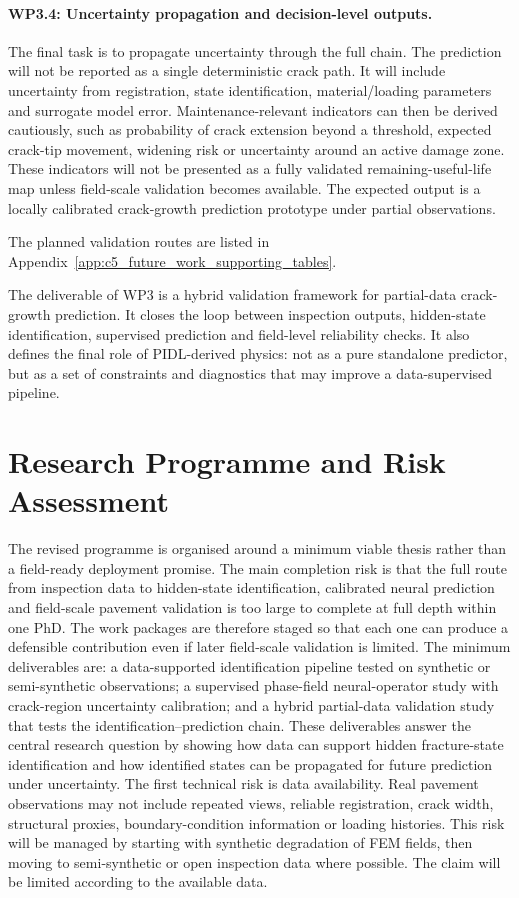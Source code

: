 \paragraph{WP3.4: Uncertainty propagation and decision-level outputs.}
The final task is to propagate uncertainty through the full chain.
The prediction will not be reported as a single deterministic crack path.
It will include uncertainty from registration, state identification, material/loading parameters and surrogate model error.
Maintenance-relevant indicators can then be derived cautiously, such as probability of crack extension beyond a threshold, expected crack-tip movement, widening risk or uncertainty around an active damage zone.
These indicators will not be presented as a fully validated remaining-useful-life map unless field-scale validation becomes available.
The expected output is a locally calibrated crack-growth prediction prototype under partial observations.

The planned validation routes are listed in Appendix~\ref{app:c5_future_work_supporting_tables}.

The deliverable of WP3 is a hybrid validation framework for partial-data crack-growth prediction.
It closes the loop between inspection outputs, hidden-state identification, supervised prediction and field-level reliability checks.
It also defines the final role of PIDL-derived physics: not as a pure standalone predictor, but as a set of constraints and diagnostics that may improve a data-supervised pipeline.

\section{Research Programme and Risk Assessment}

The revised programme is organised around a minimum viable thesis rather than a field-ready deployment promise.
The main completion risk is that the full route from inspection data to hidden-state identification, calibrated neural prediction and field-scale pavement validation is too large to complete at full depth within one PhD.
The work packages are therefore staged so that each one can produce a defensible contribution even if later field-scale validation is limited.
The minimum deliverables are: a data-supported identification pipeline tested on synthetic or semi-synthetic observations;
a supervised phase-field neural-operator study with crack-region uncertainty calibration; and a hybrid partial-data validation study that tests the identification--prediction chain.
These deliverables answer the central research question by showing how data can support hidden fracture-state identification and how identified states can be propagated for future prediction under uncertainty.
The first technical risk is data availability. Real pavement observations may not include repeated views, reliable registration, crack width, structural proxies, boundary-condition information or loading histories.
This risk will be managed by starting with synthetic degradation of FEM fields, then moving to semi-synthetic or open inspection data where possible.
The claim will be limited according to the available data.


